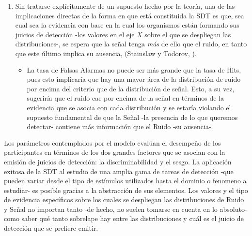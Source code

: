 \begin{enumerate}
\item Sin tratarse explícitamente de un supuesto hecho por la teoría, una de las implicaciones directas de la forma en que está constituida la SDT es que, sea cual sea la evidencia con base en la cual los organismos están formando sus juicios de detección -los valores en el eje $X$ sobre el que se despliegan las distribuciones-, se espera que la señal tenga \textit{más} de ello que el ruido, en tanto que este último implica su ausencia, (Stainslaw y Todorov, \citeyear{Stainslaw1999}).\\
  \begin{itemize}

  \item La tasa de Falsas Alarmas no puede ser más grande que la tasa de Hits, pues esto implicaría que hay una mayor área de la distribución de ruido por encima del criterio que de la distribución de señal. Esto, a su vez, sugeriría que el ruido cae por encima de la señal en términos de la evidencia que se asocia con cada distribución y se estaría violando el supuesto fundamental de que la Señal -la presencia de lo que queremos detectar- contiene más información que el Ruido -su ausencia-.\\
  \end{itemize}
\end{enumerate}

Los parámetros contemplados por el modelo evalúan el desempeño de los participantes en términos de los dos grandes factores que se asocian con la emisión de juicios de detección: la discriminabilidad y el sesgo. La aplicación exitosa de la SDT al estudio de una amplia gama de tareas de detección -que pueden variar desde el tipo de estímulos utilizados hasta el dominio o fenomeno a estudiar- es posible gracias a la abstracción de sus elementos. Los valores y el tipo de evidencia específicos sobre los cuales se despliegan las distribuciones de Ruido y Señal no importan tanto -de hecho, no suelen tomarse en cuenta en lo absoluto- como saber qué tanto sobrelape hay entre las distribuciones y cuál es el juicio de detección que se prefiere emitir.\\

